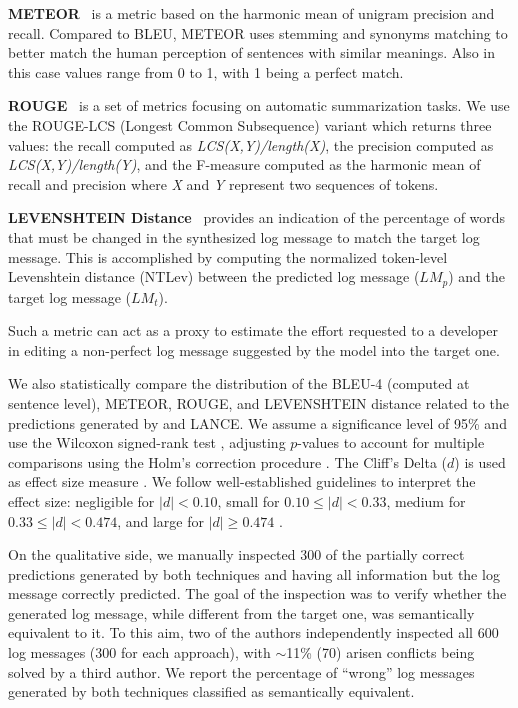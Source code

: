 \textbf{METEOR}~\cite{meteor} is a metric based on the harmonic mean of unigram precision and recall. Compared to BLEU, METEOR uses stemming and synonyms matching to better match the human perception of sentences with similar meanings. Also in this case values range from 0 to 1, with 1 being a perfect match.

\textbf{ROUGE}~\cite{lin2004rouge} is a set of metrics focusing on automatic summarization tasks. We use the ROUGE-LCS (Longest Common Subsequence) variant which returns three values: the recall computed as \textit{LCS(X,Y)/length(X)}, the precision computed as \textit{LCS(X,Y)/length(Y)}, and the F-measure computed as the harmonic mean of recall and precision where \textit{X} and \textit{Y} represent two sequences of tokens.

\textbf{LEVENSHTEIN Distance}~\cite{levenshtein1966} provides an indication of the percentage of words that must be changed in the synthesized log message to match the target log message. This is accomplished by computing the normalized token-level Levenshtein distance \cite{levenshtein1966} (NTLev) between the predicted log message ($LM_p$) and the target log message ($LM_t$).

%

Such a metric can act as a proxy to estimate the effort requested to a developer in editing a non-perfect log message suggested by the model into the target one.

We also statistically compare the distribution of the BLEU-4 (computed at sentence level), METEOR, ROUGE, and LEVENSHTEIN distance related to the predictions generated by \approach and LANCE. We assume a significance level of 95\% and use the Wilcoxon signed-rank test \cite{wilcoxon}, adjusting $p$-values to account for multiple comparisons using the Holm's correction procedure \cite{Holm1979a}. The  Cliff's Delta ($d$) is used as effect size measure \cite{Gris2005a}. We follow well-established guidelines to interpret the effect size: negligible for $|d| < 0.10$, small for $0.10 \le |d| < 0.33$, medium for $0.33 \le |d| < 0.474$, and large for $|d| \ge 0.474$ \cite{Gris2005a}.

On the qualitative side, we manually inspected 300 of the partially correct predictions generated by both techniques and having all information but the log message correctly predicted. The goal of the inspection was to verify whether the generated log message, while different from the target one, was semantically equivalent to it. To this aim, two of the authors independently inspected all 600 log messages (300 for each approach), with $\sim$11\% (70) arisen conflicts being solved by a third author. We report the percentage of ``wrong'' log messages generated by both techniques classified as semantically equivalent.

